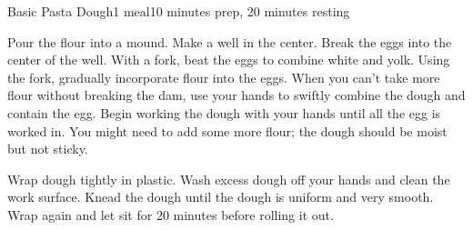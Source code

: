 \documentclass[../Cookbook.tex]{subfiles}
\begin{document}
\begin{recipe}{Basic Pasta Dough}{1 meal}{10 minutes prep, 20 minutes resting}

Pour the flour into a mound. Make a well in the center. Break the eggs into the center of the well. With a fork, beat the eggs to combine white and yolk. Using the fork, gradually incorporate flour into the eggs.
When you can't take more flour without breaking the dam, use your hands to swiftly combine the dough and contain the egg. Begin working the dough with your hands until all the egg is worked in. You might need to add some more flour; the dough should be moist but not sticky.

\newstep
Wrap dough tightly in plastic. Wash excess dough off your hands and clean the work surface. Knead the dough until the dough is uniform and very smooth. Wrap again and let sit for 20 minutes before rolling it out.

\end{recipe}
\end{document}

